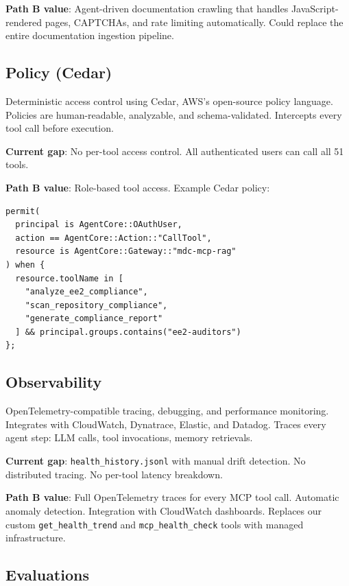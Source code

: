 \documentclass[11pt,letterpaper]{article}
\begin{document}
\textbf{Path B value}: Agent-driven documentation crawling that handles
JavaScript-rendered pages, CAPTCHAs, and rate limiting automatically.
Could replace the entire documentation ingestion pipeline.

\subsection{Policy (Cedar)}

Deterministic access control using Cedar, AWS's open-source policy
language. Policies are human-readable, analyzable, and schema-validated.
Intercepts every tool call before execution.

\textbf{Current gap}: No per-tool access control. All authenticated
users can call all 51 tools.

\textbf{Path B value}: Role-based tool access. Example Cedar policy:

\begin{lstlisting}[caption={Cedar policy restricting EE2 compliance tools to auditors.}]
permit(
  principal is AgentCore::OAuthUser,
  action == AgentCore::Action::"CallTool",
  resource is AgentCore::Gateway::"mdc-mcp-rag"
) when {
  resource.toolName in [
    "analyze_ee2_compliance",
    "scan_repository_compliance",
    "generate_compliance_report"
  ] && principal.groups.contains("ee2-auditors")
};
\end{lstlisting}

\subsection{Observability}

OpenTelemetry-compatible tracing, debugging, and performance monitoring.
Integrates with CloudWatch, Dynatrace, Elastic, and Datadog. Traces
every agent step: LLM calls, tool invocations, memory retrievals.

\textbf{Current gap}: \texttt{health\_history.jsonl} with manual drift
detection. No distributed tracing. No per-tool latency breakdown.

\textbf{Path B value}: Full OpenTelemetry traces for every MCP tool
call. Automatic anomaly detection. Integration with CloudWatch dashboards.
Replaces our custom \texttt{get\_health\_trend} and \texttt{mcp\_health\_check}
tools with managed infrastructure.

\subsection{Evaluations}
\end{document}
